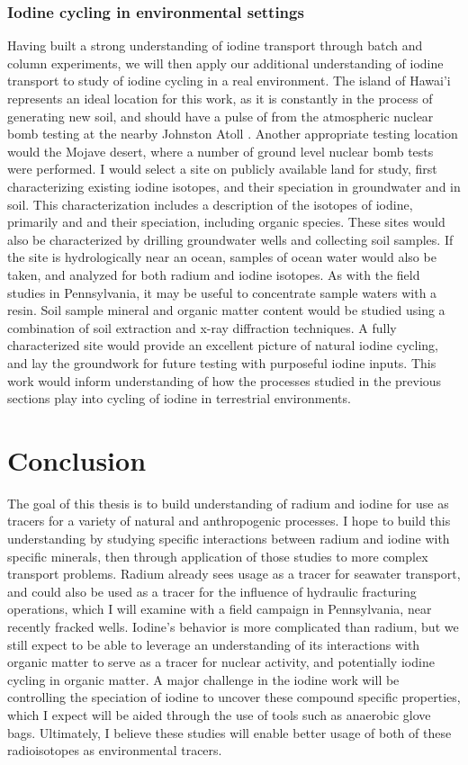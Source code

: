 \documentclass[twoside,12pt,titlepage]{article}
\newcommand{\isotope}[2]{\ch{^{#1}#2}}
\begin{document}
\subsubsection{Iodine cycling in environmental settings}
Having built a strong understanding of iodine transport through batch and column experiments, we will then apply our additional understanding of iodine transport to study of iodine cycling in a real environment. The island of Hawai'i represents an ideal location for this work, as it is constantly in the process of generating new soil, and should have a pulse of \isotope{129}{I} from the atmospheric nuclear bomb testing at the nearby Johnston Atoll \cite{WikiStarfishPrime}. Another appropriate testing location would the Mojave desert, where a number of ground level nuclear bomb tests were performed. I would select a site on publicly available land for study, first characterizing existing iodine isotopes, and their speciation in groundwater and in soil. This characterization includes a description of the isotopes of iodine, primarily \isotope{127}{I} and \isotope{129}{I} and their speciation, including organic species. These sites would also be characterized by drilling groundwater wells and collecting soil samples. If the site is hydrologically near an ocean, samples of ocean water would also be taken, and analyzed for both radium and iodine isotopes. As with the field studies in Pennsylvania, it may be useful to concentrate sample waters with a resin. Soil sample mineral and organic matter content would be studied using a combination of soil extraction and x-ray diffraction techniques. A fully characterized site would provide an excellent picture of natural iodine cycling, and lay the groundwork for future testing with purposeful iodine inputs. This work would inform understanding of how the processes studied in the previous sections play into cycling of iodine in terrestrial environments.


\section{Conclusion}

The goal of this thesis is to build understanding of radium and iodine for use as tracers for a variety of natural and anthropogenic processes. I hope to build this understanding by studying specific interactions between radium and iodine with specific minerals, then through application of those studies to more complex transport problems. Radium already sees usage as a tracer for seawater transport, and could also be used as a tracer for the influence of hydraulic fracturing operations, which I will examine with a field campaign in Pennsylvania, near recently fracked wells. Iodine's behavior is more complicated than radium, but we still expect to be able to leverage an understanding of its interactions with organic matter to serve as a tracer for nuclear activity, and potentially iodine cycling in organic matter. A major challenge in the iodine work will be controlling the speciation of iodine to uncover these compound specific properties, which I expect will be aided through the use of tools such as anaerobic glove bags. Ultimately, I believe these studies will enable better usage of both of these radioisotopes as environmental tracers.



\end{document}
